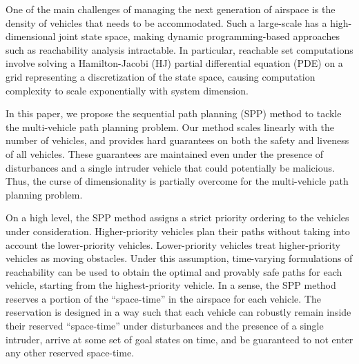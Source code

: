 One of the main challenges of managing the next generation of airspace is the density of vehicles that needs to be accommodated. Such a large-scale has a high-dimensional joint state space, making dynamic programming-based approaches such as reachability analysis intractable. In particular, reachable set computations involve solving a Hamilton-Jacobi (HJ) partial differential equation (PDE) on a grid representing a discretization of the state space, causing computation complexity to scale exponentially with system dimension. 

In this paper, we propose the sequential path planning (SPP) method to tackle the multi-vehicle path planning problem. Our method scales linearly with the number of vehicles, and provides hard guarantees on both the safety and liveness of all vehicles. These guarantees are maintained even under the presence of disturbances and a single intruder vehicle that could potentially be malicious. Thus, the curse of dimensionality is partially overcome for the multi-vehicle path planning problem. 

On a high level, the SPP method assigns a strict priority ordering to the vehicles under consideration. Higher-priority vehicles plan their paths without taking into account the lower-priority vehicles. Lower-priority vehicles treat higher-priority vehicles as moving obstacles. Under this assumption, time-varying formulations of reachability \cite{} can be used to obtain the optimal and provably safe paths for each vehicle, starting from the highest-priority vehicle. In a sense, the SPP method reserves a portion of the ``space-time'' in the airspace for each vehicle. The reservation is designed in a way such that each vehicle can robustly remain inside their reserved ``space-time'' under disturbances and the presence of a single intruder, arrive at some set of goal states on time, and be guaranteed to not enter any other reserved space-time.


